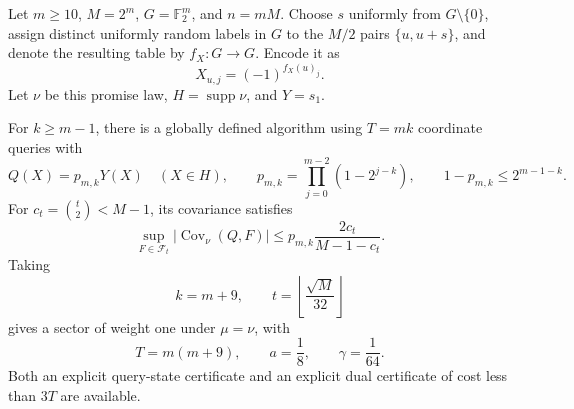 \begin{proposition}
\label{ian:pac-simon-check}
Let \(m\ge10\), \(M=2^m\), \(G=\mathbb F_2^m\), and \(n=mM\).
Choose \(s\) uniformly from \(G\setminus\{0\}\), assign distinct
uniformly random labels in \(G\) to the \(M/2\) pairs
\(\{u,u+s\}\), and denote the resulting table by \(f_X:G\to G\).
Encode it as
\[
 X_{u,j}=(-1)^{f_X(u)_j}.
\]
Let \(\nu\) be this promise law, \(H=\operatorname{supp}\nu\),
and \(Y=s_1\).

For \(k\ge m-1\), there is a globally defined algorithm using
\(T=mk\) coordinate queries with
\[
 Q(X)=p_{m,k}Y(X)\quad(X\in H),
 \qquad
 p_{m,k}=\prod_{j=0}^{m-2}(1-2^{j-k}),
 \qquad
 1-p_{m,k}\le2^{m-1-k}.
 \tag{32.21}\label{ian:pac-simon-acceptance}
\]
For \(c_t=\binom t2<M-1\), its covariance satisfies
\[
 \sup_{F\in\mathcal F_t}|\operatorname{Cov}_\nu(Q,F)|
 \le p_{m,k}\frac{2c_t}{M-1-c_t}.
 \tag{32.22}\label{ian:pac-simon-hiding}
\]
Taking
\[
 k=m+9,\qquad
 t=\left\lfloor\frac{\sqrt M}{32}\right\rfloor
\]
gives a sector of weight one under \(\mu=\nu\), with
\[
 T=m(m+9),\qquad a=\frac18,\qquad\gamma=\frac1{64}.
\]
Both an explicit query-state certificate and an explicit dual
certificate of cost less than \(3T\) are available.
\end{proposition}

